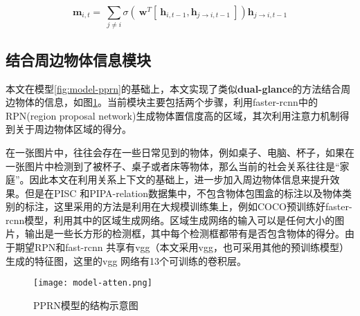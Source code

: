 \begin{equation}
    \label{eq:model-mp-atten}
	\bm{m}_{i,t} = ~\sum_{j\neq i} \sigma{(~\bm{w}^T[~\bm{h}_{i,t-1},\bm{h}_{j \to i,t-1}~]) \bm{h}_{j \to i,t-1}}	
\end{equation}



\subsection{结合周边物体信息模块}

本文在模型\ref{fig:model-pprn}的基础上，本文实现了类似\textbf{dual-glance}的方法结合周边物体的信息，如图\ref{fig:model-atten}。当前模块主要包括两个步骤，利用faster-rcnn中的RPN(region proposal network)生成物体置信度高的区域，其次利用注意力机制得到关于周边物体区域的得分。

在一张图片中，往往会存在一些日常见到的物体，例如桌子、电脑、杯子，如果在一张图片中检测到了被杯子、桌子或者床等物体，那么当前的社会关系往往是``家庭''。因此本文在利用关系上下文的基础上，进一步加入周边物体信息来提升效果。但是在PISC 和PIPA-relation数据集中，不包含物体包围盒的标注以及物体类别的标注，这里采用的方法是利用在大规模训练集上，例如COCO\cite{lin2014microsoft}预训练好faster-rcnn模型，利用其中的区域生成网络。区域生成网络的输入可以是任何大小的图片，输出是一些长方形的检测框，其中每个检测框都带有是否包含物体的得分。由于期望RPN和fast-rcnn 共享有vgg\cite{simonyan2015very}（本文采用vgg，也可采用其他的预训练模型）生成的特征图，这里的vgg 网络有13个可训练的卷积层。
\begin{figure}[htpb]
	\centering
	\texttt{[image: model-atten.png]}
    \caption{PPRN模型的结构示意图}
	\vspace*{-3.5mm}
	\label{fig:model-atten}
\end{figure}


